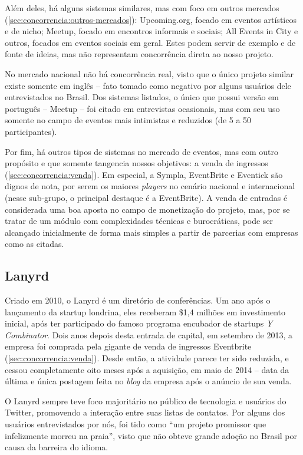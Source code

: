 \documentclass[12pt,a4paper,twoside,hyphens,english,brazil]{abntex2}
\begin{document}
Além deles, há alguns sistemas similares, mas com foco em outros mercados (\autoref{sec:concorrencia:outros-mercados}): Upcoming.org, focado em eventos artísticos e de nicho; Meetup, focado em encontros informais e sociais; All Events in City e outros, focados em eventos sociais em geral. Estes podem servir de exemplo e de fonte de ideias, mas não representam concorrência direta ao nosso projeto.

No mercado nacional não há concorrência real, visto que o único projeto similar existe somente em inglês -- fato tomado como negativo por alguns usuários dele entrevistados no Brasil. Dos sistemas listados, o único que possui versão em português -- Meetup -- foi citado em entrevistas ocasionais, mas com seu uso somente no campo de eventos mais intimistas e reduzidos (de 5 a 50 participantes).

Por fim, há outros tipos de sistemas no mercado de eventos, mas com outro propósito e que somente tangencia nossos objetivos: a venda de ingressos (\autoref{sec:concorrencia:venda}). Em especial, a Sympla, EventBrite e Eventick são dignos de nota, por serem os maiores \emph{players} no cenário nacional e internacional (nesse sub-grupo, o principal destaque é a EventBrite). A venda de entradas é considerada uma boa aposta no campo de monetização do projeto, mas, por se tratar de um módulo com complexidades técnicas e burocráticas, pode ser alcançado inicialmente de forma mais simples a partir de parcerias com empresas como as citadas.

\subsection{Lanyrd} \label{sec:concorrencia:lanyrd}
Criado em 2010, o Lanyrd é um diretório de conferências. Um ano após o lançamento da startup londrina, eles receberam \$1,4 milhões em investimento inicial, após ter participado do famoso programa encubador de startups \emph{Y Combinator}\cite{lanyrd-ycombinator}. Dois anos depois desta entrada de capital, em setembro de 2013, a empresa foi comprada pela gigante de venda de ingressos Eventbrite (\autoref{sec:concorrencia:venda}). Desde então, a atividade parece ter sido reduzida, e cessou completamente oito meses após a aquisição, em maio de 2014 -- data da última e única postagem feita no \emph{blog} da empresa após o anúncio de sua venda.

O Lanyrd sempre teve foco majoritário no público de tecnologia e usuários do Twitter, promovendo a interação entre suas listas de contatos. Por alguns dos usuários entrevistados por nós, foi tido como ``um projeto promissor que infelizmente morreu na praia'', visto que não obteve grande adoção no Brasil por causa da barreira do idioma.
\end{document}
